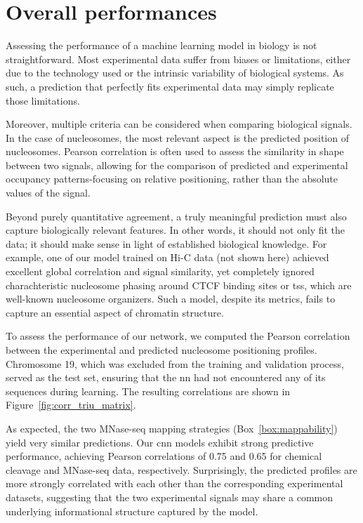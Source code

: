 \documentclass[11pt]{book}
\begin{document}
\section{Overall performances}
\vspace{1em}
\begin{tcolorbox}[title=What is a good prediction?, colframe=pink, colback=pink!10!white,coltitle=black, breakable, fonttitle=\bfseries]

Assessing the performance of a machine learning model in biology is not straightforward. Most experimental data suffer from biases or limitations, either due to the technology used or the intrinsic variability of biological systems. As such, a prediction that perfectly fits experimental data may simply replicate those limitations.

Moreover, multiple criteria can be considered when comparing biological signals. In the case of nucleosomes, the most relevant aspect is the predicted position of nucleosomes. Pearson correlation is often used to assess the similarity in shape between two signals, allowing for the comparison of predicted and experimental occupancy patterns-focusing on relative positioning, rather than the absolute values of the signal.

Beyond purely quantitative agreement, a truly meaningful prediction must also capture biologically relevant features. In other words, it should not only fit the data; it should make sense in light of established biological knowledge. For example, one of our model trained on Hi-C data (not shown here) achieved excellent global correlation and signal similarity, yet completely ignored charachteristic nucleosome phasing around CTCF binding sites or \gls{tss}, which are well-known nucleosome organizers. Such a model, despite its metrics, fails to capture an essential aspect of chromatin structure.
\end{tcolorbox}
\vspace{1em}

To assess the performance of our network, we computed the Pearson correlation between the experimental and predicted nucleosome positioning profiles. Chromosome 19, which was excluded from the training and validation process, served as the test set, ensuring that the \gls{nn} had not encountered any of its sequences during learning. The resulting correlations are shown in Figure~\ref{fig:corr_triu_matrix}.

As expected, the two MNase-seq mapping strategies (Box~\ref{box:mappability}) yield very similar predictions. Our \gls{cnn} models exhibit strong predictive performance, achieving Pearson correlations of 0.75 and 0.65 for chemical cleavage and MNase-seq data, respectively. Surprisingly, the predicted profiles are more strongly correlated with each other than the corresponding experimental datasets, suggesting that the two experimental signals may share a common underlying informational structure captured by the model.
\end{document}
